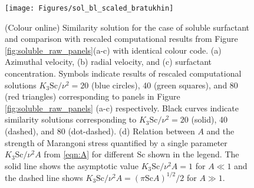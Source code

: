 \documentclass[]{jfm}
\newcommand{\Sc}{\text{Sc}}
\begin{document}
\begin{figure}
\centerline{\texttt{[image: Figures/sol\_bl\_scaled\_bratukhin]}}
\caption{(Colour online) Similarity solution for the case of soluble surfactant and comparison with rescaled computational results from Figure \ref{fig:soluble_raw_panels}(a-c) with identical colour code.
(a) Azimuthal velocity, (b) radial velocity, and (c) surfactant concentration. 
Symbols indicate results of rescaled computational solutions $K_3 \Sc/\nu^2=20$ (blue circles), 40 (green squares), and 80 (red triangles) corresponding to panels in Figure \ref{fig:soluble_raw_panels} (a-c) respectively. 
Black curves indicate similarity solutions corresponding to $K_3 \Sc/\nu^2=20$ (solid), 40 (dashed), and 80 (dot-dashed).
(d) Relation between $A$ and the strength of Marangoni stress quantified by a single parameter $K_3 \Sc /\nu^2A$ from \eqref{eqn:A} for different $\Sc$ shown in the legend. 
The solid line shows the asymptotic value $K_3 \Sc /\nu^2A=1$ for $A\ll 1$ and the dashed line shows  $K_3 \Sc /\nu^2A=(\pi \Sc A)^{1/2}/2$ for $A \gg 1$.
}
\label{fig:sol_bl_scaled_bratukhin}
\end{figure}

% 
\end{document}
